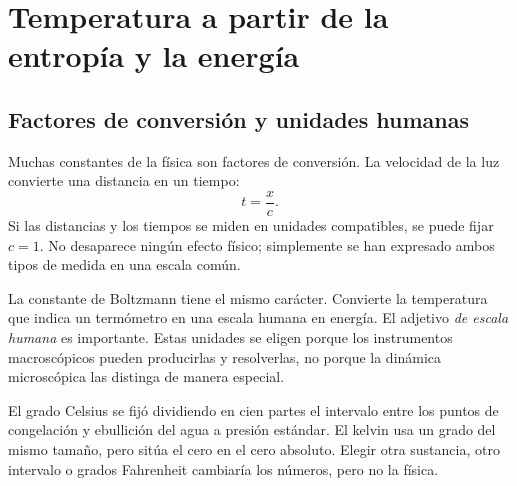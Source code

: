 \chapter{Temperatura a partir de la entropía y la energía}


\section{Factores de conversión y unidades humanas}

Muchas constantes de la física son factores de conversión. La velocidad de la luz convierte una distancia en un tiempo:
\begin{equation}
 t=\frac{x}{c}.
\end{equation}
Si las distancias y los tiempos se miden en unidades compatibles, se puede fijar \(c=1\). No desaparece ningún efecto físico; simplemente se han expresado ambos tipos de medida en una escala común.

La constante de Boltzmann tiene el mismo carácter. Convierte la temperatura que indica un termómetro en una escala humana en energía. El adjetivo \emph{de escala humana} es importante. Estas unidades se eligen porque los instrumentos macroscópicos pueden producirlas y resolverlas, no porque la dinámica microscópica las distinga de manera especial.

El grado Celsius se fijó dividiendo en cien partes el intervalo entre los puntos de congelación y ebullición del agua a presión estándar. El kelvin usa un grado del mismo tamaño, pero sitúa el cero en el cero absoluto. Elegir otra sustancia, otro intervalo o grados Fahrenheit cambiaría los números, pero no la física.

\begin{classroomqa}
\end{classroomqa}

